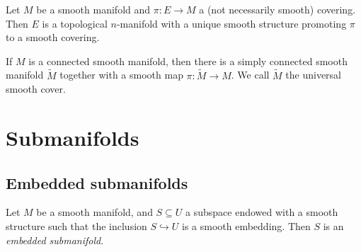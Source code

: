 \begin{proposition}\label{1.2.40}
	Let $M$ be a smooth manifold and $\pi : E \to M$ a (not necessarily smooth) covering. Then $E$ is a topological $n$-manifold with a unique smooth structure promoting $\pi $ to a smooth covering.
\end{proposition}

\begin{corollary}\label{1.2.41}
	If $M$ is a connected smooth manifold, then there is a simply connected smooth manifold $\widetilde{M} $ together with a smooth map $\pi : \widetilde{M}  \to M$. We call $\widetilde{M} $ the universal smooth cover.
\end{corollary}

\chapter{Submanifolds}

\section{Embedded submanifolds}

\begin{definition}\label{3.1.1}
	Let $M$ be a smooth manifold, and $S\subseteq U$ a subspace endowed with a smooth structure such that the inclusion $S\hookrightarrow U$ is a smooth embedding. Then $S$ is an \emph{embedded submanifold}.
\end{definition}


